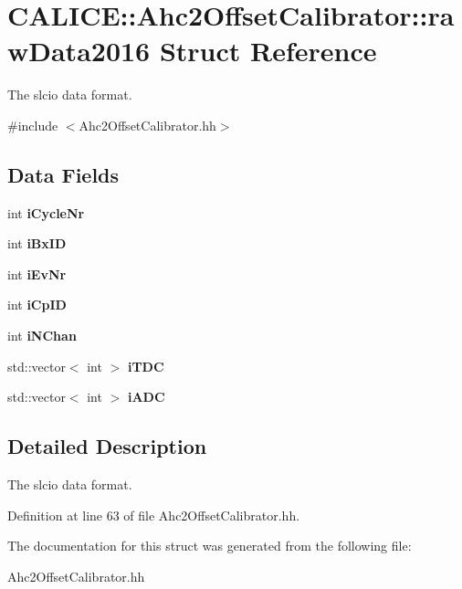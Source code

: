 \section{C\-A\-L\-I\-C\-E\-:\-:Ahc2\-Offset\-Calibrator\-:\-:raw\-Data2016 Struct Reference}
\label{structCALICE_1_1Ahc2OffsetCalibrator_1_1rawData2016}


The slcio data format.  




{\ttfamily \#include $<$Ahc2\-Offset\-Calibrator.\-hh$>$}

\subsection*{Data Fields}
\begin{DoxyCompactItemize}
\item 
int {\bfseries i\-Cycle\-Nr}\label{structCALICE_1_1Ahc2OffsetCalibrator_1_1rawData2016_a2b72d43c0388a78a601acb429e3d482b}

\item 
int {\bfseries i\-Bx\-I\-D}\label{structCALICE_1_1Ahc2OffsetCalibrator_1_1rawData2016_ac4d4e2f69d4b52fdc8e220fb975cf745}

\item 
int {\bfseries i\-Ev\-Nr}\label{structCALICE_1_1Ahc2OffsetCalibrator_1_1rawData2016_acc1cfe18b3a11deb2decfd0457242ff2}

\item 
int {\bfseries i\-Cp\-I\-D}\label{structCALICE_1_1Ahc2OffsetCalibrator_1_1rawData2016_acc230b86c79374060686e4ae899084a2}

\item 
int {\bfseries i\-N\-Chan}\label{structCALICE_1_1Ahc2OffsetCalibrator_1_1rawData2016_a7798943a63a125403bcaf6caad9739a8}

\item 
std\-::vector$<$ int $>$ {\bfseries i\-T\-D\-C}\label{structCALICE_1_1Ahc2OffsetCalibrator_1_1rawData2016_af512f3a9a6faa0a315ff5338a5cf04e1}

\item 
std\-::vector$<$ int $>$ {\bfseries i\-A\-D\-C}\label{structCALICE_1_1Ahc2OffsetCalibrator_1_1rawData2016_ae943a29e5b603cd3f83cd6a4021bedfd}

\end{DoxyCompactItemize}


\subsection{Detailed Description}
The slcio data format. 

Definition at line 63 of file Ahc2\-Offset\-Calibrator.\-hh.



The documentation for this struct was generated from the following file\-:\begin{DoxyCompactItemize}
\item 
Ahc2\-Offset\-Calibrator.\-hh\end{DoxyCompactItemize}
